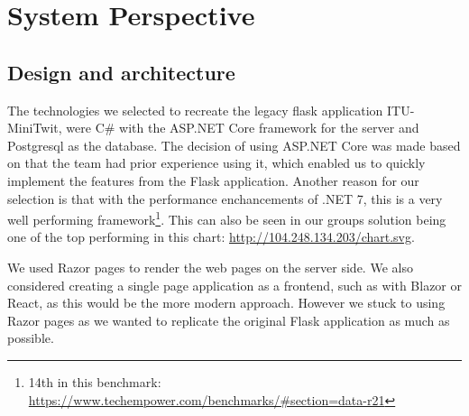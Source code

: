 \section{System Perspective}




\subsection{Design and architecture}

The technologies we selected to recreate the legacy flask application ITU-MiniTwit, were C\# with the ASP.NET Core framework for the server and Postgresql as the database. The decision of using ASP.NET Core was made based on that the team had prior experience using it, which enabled us to quickly implement the features from the Flask application. Another reason for our selection is that with the performance enchancements of .NET 7, this is a very well performing framework\footnote{14th in this benchmark: 
\url{https://www.techempower.com/benchmarks/#section=data-r21}}. This can also be seen in our groups solution being one of the top performing in this chart: \url{http://104.248.134.203/chart.svg}.

We used Razor pages to render the web pages on the server side. We also considered creating a single page application as a frontend, such as with Blazor or React, as this would be the more modern approach. However we stuck to using Razor pages as we wanted to replicate the original Flask application as much as possible.

